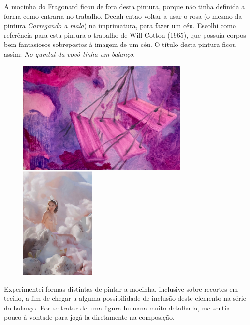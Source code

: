 A mocinha do Fragonard ficou de fora desta pintura, porque não tinha
definida a forma como entraria no trabalho. Decidi então voltar a usar
o rosa (o mesmo da pintura \emph{Carregando a mala}) na imprimatura,
para fazer um céu. Escolhi como referência para esta pintura o trabalho
de Will Cotton (1965), que possuía corpos bem fantasiosos sobrepostos à
imagem de um céu. O título desta pintura ficou assim: \emph{No quintal
	da vovó tinha um balanço}.

\begin{figure}
\begin{minipage}{.6\linewidth}
	\caption{}%
	\label{odette-quintal-vovo-tinha-balanco-2021}
	\includegraphics[width=3.38543in,height=2.229in]{figuras/odette-quintal-vovo-tinha-balanco-2021.pdf.compressed.pdf}
\end{minipage}\hfill
\begin{minipage}{.3\linewidth}
	\caption{}
	\includegraphics[height=2.229in]{figuras/cotton-fairy-floss.pdf.compressed.pdf}
\end{minipage}
\end{figure}

Experimentei formas distintas de pintar a mocinha, inclusive sobre
recortes em tecido, a fim de chegar a alguma possibilidade de inclusão
deste elemento na série do balanço. Por se tratar de uma figura humana
muito detalhada, me sentia pouco à vontade para jogá-la diretamente na
composição.

